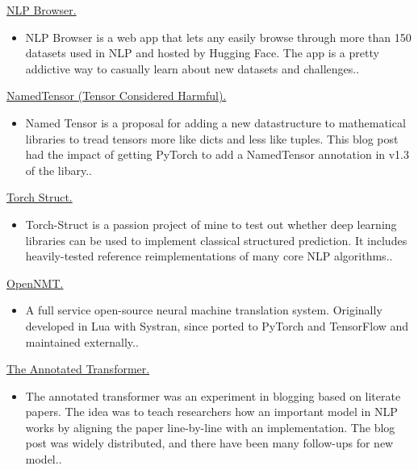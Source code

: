 \documentclass[10pt]{article}
\begin{document}
\ind \href{ paper.link } { NLP Browser. }
\begin{itemize}
	\item NLP Browser is a web app that lets any easily browse through more than 150 datasets used in NLP and hosted by Hugging Face. The app is a pretty addictive way to casually learn about new datasets and challenges..
\end{itemize}
\medskip


\ind \href{ paper.link } { NamedTensor (Tensor Considered Harmful). }
\begin{itemize}
	\item Named Tensor is a proposal for adding a new datastructure to mathematical libraries to tread tensors more like dicts and less like tuples. This blog post had the impact of getting PyTorch to add a NamedTensor annotation in v1.3 of the libary..
\end{itemize}
\medskip


\ind \href{ paper.link } { Torch Struct. }
\begin{itemize}
	\item Torch-Struct is a passion project of mine to test out whether deep learning libraries can be used to implement classical structured prediction. It includes heavily-tested reference reimplementations of many core NLP algorithms..
\end{itemize}
\medskip


\ind \href{ paper.link } { OpenNMT. }
\begin{itemize}
	\item A full service open-source neural machine translation system. Originally developed in Lua with Systran, since ported to PyTorch and TensorFlow and maintained externally..
\end{itemize}
\medskip


\ind \href{ paper.link } { The Annotated Transformer. }
\begin{itemize}
	\item The annotated transformer was an experiment in blogging based on literate papers. The idea was to teach researchers how an important model in NLP works by aligning the paper line-by-line with an implementation. The blog post was widely distributed, and there have been many follow-ups for new model..
\end{itemize}
\medskip





\end{document}
